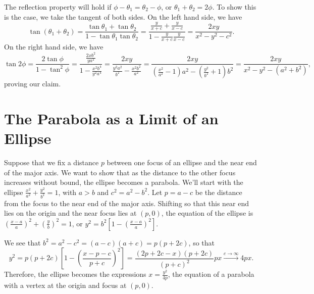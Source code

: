 \nofiles\documentclass{article}
\newcommand{\colorone}{blue}
\begin{document}
The reflection property will hold if $\phi-\theta_1=\theta_2-\phi$, or $\theta_1+\theta_2=2\phi$. To show this is the case, we take the tangent of both sides.  On the left hand side, we have
\[
 \tan(\theta_1+\theta_2)
 =\frac{\tan\theta_1+\tan\theta_2}{1-\tan\theta_1\tan\theta_2}
 =\frac{\frac y{x+c}+\frac y{x-c}}{1-\frac y{x+c}\frac y{x-c}}
 =\frac{2xy}{x^2-y^2-c^2}.
\]
On the right hand side, we have
\[
 \tan2\phi=\frac{2\tan\phi}{1-\tan^2\phi}
 =\frac{\frac{2xb^2}{ya^2}}{1-\frac{x^2b^4}{y^2a^4}}
 =\frac{2xy}{\frac{y^2a^2}{b^2}-\frac{x^2b^2}{a^2}}
 =\frac{2xy}{(\frac{x^2}{a^2}-1)a^2-(\frac{y^2}{b^2}+1)b^2}
 =\frac{2xy}{x^2-y^2-(a^2+b^2)},
\]
proving our claim.

\section{The Parabola as a Limit of an Ellipse}

Suppose that we fix a distance $p$ between one focus of an ellipse and the near end of the major axis.  We want to show that as the distance to the other focus increases without bound, the ellipse becomes a parabola.  We'll start with the ellipse $\frac{x^2}{a^2}+\frac{y^2}{b^2}=1$, with $a>b$ and $c^2=a^2-b^2$.  Let $p=a-c$ be the distance from the focus to the near end of the major axis.  Shifting so that this near end lies on the origin and the near focus lies at $(p,0)$, the equation of the ellipse is $(\frac{x-a}a)^2+(\frac yb)^2=1$, or $y^2=b^2[1-(\frac{x-a}a)^2]$.
\begin{center}
\end{center}
We see that $b^2=a^2-c^2=(a-c)(a+c)=p(p+2c)$, so that
\[
 y^2=p(p+2c)\left[1-\left(\frac{x-p-c}{p+c}\right)^2\right]
 =\frac{(2p+2c-x)(p+2c)}{(p+c)^2}px
 \mathrel{\overset{c\to\infty}{\longrightarrow}}4px.
\]
Therefore, the ellipse becomes the expressions $x=\frac{y^2}{4p}$, the equation of a parabola with a vertex at the origin and focus at $(p,0)$.
\end{document}

